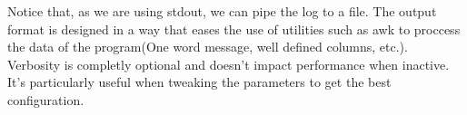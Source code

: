   Notice that, as we are using stdout, we can pipe the log to a file. The
  output format is designed in a way that eases the use of utilities such as
  awk to proccess the data of the program(One word message, well defined
  columns, etc.).\\

  Verbosity is completly optional and doesn't impact performance when inactive.
  It's particularly useful when tweaking the parameters to get the best
  configuration.\\
